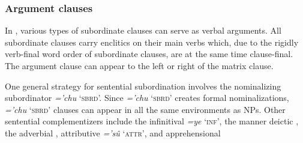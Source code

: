 \documentclass[output=paper,colorlinks,citecolor=brown]{langscibook}
\begin{document}

\subsubsection{Argument clauses}
\label{sec:argumentclauses}

In , various types of subordinate clauses can serve as verbal arguments. All subordinate clauses carry enclitics on their main verbs which, due to the rigidly verb-final word order of subordinate clauses, are at the same time clause-final. The argument clause can appear to the left or right of the matrix clause.

{One general strategy for sentential subordination involves the nominalizing subordinator \emph{='chu} `\textsc{sbrd}'. Since \emph{='chu} `\textsc{sbrd}' creates formal nominalizations, \emph{='chu} `\textsc{sbrd}' clauses can appear in all the same environments as NPs. Other sentential complementizers include the infinitival \emph{=ye} `\textsc{inf}', the manner deictic , the adverbial , attributive \emph{='sû} `\textsc{attr}', and apprehensional \sane[.]}
\end{document}
